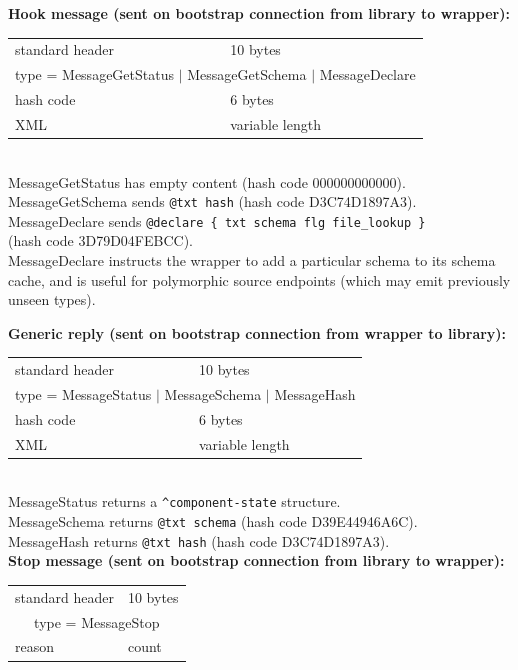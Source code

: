 \documentclass[12pt,a4paper,twoside]{article}
\renewcommand{\_}{\texttt{\symbol{95}}}
\begin{document}
\textbf{Hook message (sent on bootstrap connection from library to wrapper):}

\begin{tabular}{|ll|}
\hline
standard header    & 10 bytes\\
\multicolumn{2}{|c|}{type = MessageGetStatus $|$ MessageGetSchema $|$
MessageDeclare}\\
\hline
hash code           & 6 bytes\\
XML                 & variable length\\
\hline
\end{tabular}\\

MessageGetStatus has empty content (hash code 000000000000).\\
MessageGetSchema sends \verb^@txt hash^ (hash code D3C74D1897A3).\\
MessageDeclare sends \verb^@declare { txt schema flg file_lookup }^\\
(hash code 3D79D04FEBCC).\\

MessageDeclare instructs the wrapper to add a particular schema to its schema cache,
and is useful for polymorphic source endpoints (which may emit previously
unseen types).

\textbf{Generic reply (sent on bootstrap connection from wrapper to library):}

\begin{tabular}{|ll|}
\hline
standard header    & 10 bytes\\
\multicolumn{2}{|c|}{type = MessageStatus $|$ MessageSchema $|$ MessageHash}\\
\hline
hash code           & 6 bytes\\
XML                 & variable length\\
\hline
\end{tabular}\\

MessageStatus returns a \verb=^component-state= structure.\\
MessageSchema returns \verb^@txt schema^ (hash code D39E44946A6C).\\
MessageHash returns \verb^@txt hash^ (hash code D3C74D1897A3).\\

\textbf{Stop message (sent on bootstrap connection from library to wrapper):}

\begin{tabular}{|ll|}
\hline
standard header    & 10 bytes\\
\multicolumn{2}{|c|}{type = MessageStop}\\
\hline
reason             & count\\
\hline
\end{tabular}\\
\end{document}
